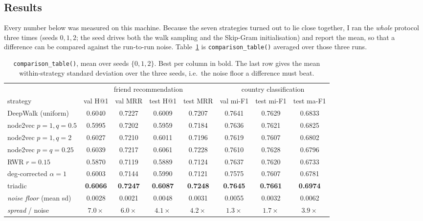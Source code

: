 \subsection{Results}
\label{p1:sec:results}

Every number below was measured on this machine.  Because the seven strategies turned out
to lie close together, I ran the \emph{whole} protocol three times (seeds $0,1,2$; the
seed drives both the walk sampling and the Skip-Gram initialisation) and report the mean,
so that a difference can be compared against the run-to-run noise.  Table~\ref{p1:tab:comparison}
is \texttt{comparison\_table()} averaged over those three runs.

\begin{table}[H]
\centering\small
\setlength{\tabcolsep}{4.5pt}
\caption{\texttt{comparison\_table()}, mean over seeds $\{0,1,2\}$.  Best per column in
bold.  The last row gives the mean within-strategy standard deviation over the three
seeds, i.e.\ the noise floor a difference must beat.}
\label{p1:tab:comparison}
\begin{tabular}{@{}lcccccc c@{}}
\toprule
& \multicolumn{4}{c}{friend recommendation} & \multicolumn{3}{c}{country classification} \\
\cmidrule(lr){2-5}\cmidrule(lr){6-8}
strategy & val H@1 & val MRR & test H@1 & test MRR & val mi-F1 & test mi-F1 & test ma-F1 \\
\midrule
DeepWalk (uniform) & 0.6040 & 0.7227 & 0.6009 & 0.7207 & 0.7641 & 0.7629 & 0.6833 \\
node2vec $p{=}1,q{=}0.5$ & 0.5995 & 0.7202 & 0.5959 & 0.7184 & 0.7636 & 0.7621 & 0.6825 \\
node2vec $p{=}1,q{=}2$ & 0.6027 & 0.7210 & 0.6011 & 0.7196 & 0.7619 & 0.7607 & 0.6802 \\
node2vec $p{=}q{=}0.25$ & 0.6039 & 0.7217 & 0.6061 & 0.7228 & 0.7610 & 0.7628 & 0.6796 \\
RWR $r{=}0.15$ & 0.5870 & 0.7119 & 0.5889 & 0.7124 & 0.7637 & 0.7620 & 0.6733 \\
deg-corrected $\alpha{=}1$ & 0.6003 & 0.7144 & 0.5990 & 0.7121 & 0.7575 & 0.7607 & 0.6781 \\
triadic & \textbf{0.6066} & \textbf{0.7247} & \textbf{0.6087} & \textbf{0.7248} & \textbf{0.7645} & \textbf{0.7661} & \textbf{0.6974} \\
\midrule
\textit{noise floor} (mean sd) & 0.0028 & 0.0021 & 0.0048 & 0.0031 & 0.0055 & 0.0032 & 0.0062 \\
\textit{spread} / noise & $7.0\times$ & $6.0\times$ & $4.1\times$ & $4.2\times$ & $1.3\times$ & $1.7\times$ & $3.9\times$ \\
\bottomrule
\end{tabular}
\end{table}

